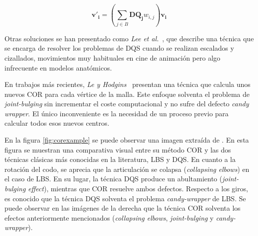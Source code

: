 \begin{equation}
\label{eqn:DQS}
\mathbf{v'_{i}} = (\sum_{j \in B} \mathbf{DQ_{j}}w_{i,j}) \mathbf{v_{i}}
\end{equation}

Otras soluciones se han presentado como \emph{Lee et al.}~\cite{Lee2013}, que describe una técnica que se encarga de resolver los problemas de \ac{DQS} cuando se realizan escalados y cizallados, movimientos muy habituales en cine de animación pero algo infrecuente en modelos anatómicos.

En trabajos más recientes, \emph{Le y Hodgins}~\cite{le2016real} presentan una técnica que calcula unos nuevos \ac{COR} para cada vértice de la malla. Este enfoque solventa el problema de \emph{joint-bulging} sin incrementar el coste computacional y no sufre del defecto \emph{candy wrapper}. El único inconveniente es la necesidad de un proceso previo para calcular todos esos nuevos centros.

En la figura \ref{fig:corexample} se puede observar una imagen extraída de \cite{le2016real}. En esta figura se muestran  una comparativa visual entre su método \ac{COR} y las dos técnicas clásicas más conocidas en la literatura, \ac{LBS} y \ac{DQS}. En cuanto a la rotación del codo, se aprecia que la articulación se colapsa (\emph{collapsing elbows}) en el caso de \ac{LBS}. En su lugar, la técnica \ac{DQS} produce un abultamiento (\emph{joint-bulging effect}), mientras que \ac{COR} resuelve ambos defectos. Respecto a los giros, es conocido que la técnica \ac{DQS} solventa el problema \emph{candy-wrapper} de \ac{LBS}. Se puede observar en las imágenes de la derecha que la técnica \ac{COR} solventa los efectos anteriormente mencionados (\emph{collapsing elbows}, \emph{joint-bulging} y \emph{candy-wrapper}). 

